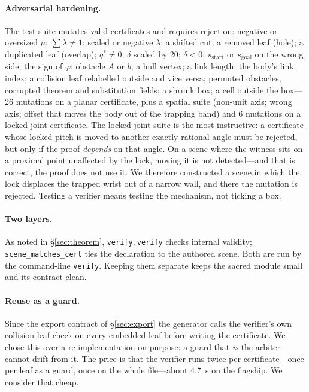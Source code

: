\documentclass[10pt,twocolumn,letterpaper]{article}
\newcommand{\vphi}{\varphi}
\begin{document}
\paragraph{Adversarial hardening.} The test suite mutates valid certificates and requires rejection: negative or oversized $\mu$; $\sum\lambda\ne1$; scaled or negative $\lambda$; a shifted cut; a removed leaf (hole); a duplicated leaf (overlap); $q^*\ne0$; $\delta$ scaled by 20; $\delta<0$; $s_{\mathrm{start}}$ or $s_{\mathrm{goal}}$ on the wrong side; the sign of $\vphi$; obstacle $A$ or $b$; a hull vertex; a link length; the body's link index; a collision leaf relabelled outside and vice versa; permuted obstacles; corrupted theorem and substitution fields; a shrunk box; a cell outside the box---26 mutations on a planar certificate, plus a spatial suite (non-unit axis; wrong axis; offset that moves the body out of the trapping band) and 6 mutations on a locked-joint certificate. The locked-joint suite is the most instructive: a certificate whose locked pitch is moved to another exactly rational angle must be rejected, but only if the proof \emph{depends} on that angle. On a scene where the witness sits on a proximal point unaffected by the lock, moving it is not detected---and that is correct, the proof does not use it. We therefore constructed a scene in which the lock displaces the trapped wrist out of a narrow wall, and there the mutation is rejected. Testing a verifier means testing the mechanism, not ticking a box.

\paragraph{Two layers.} As noted in \S\ref{sec:theorem}, \texttt{verify.verify} checks internal validity; \texttt{scene\_matches\_cert} ties the declaration to the authored scene. Both are run by the command-line \texttt{verify}. Keeping them separate keeps the sacred module small and its contract clean.

\paragraph{Reuse as a guard.} Since the export contract of \S\ref{sec:export} the generator calls the verifier's own collision-leaf check on every embedded leaf before writing the certificate. We chose this over a re-implementation on purpose: a guard that \emph{is} the arbiter cannot drift from it. The price is that the verifier runs twice per certificate---once per leaf as a guard, once on the whole file---about 4.7~s on the flagship. We consider that cheap.
\end{document}
